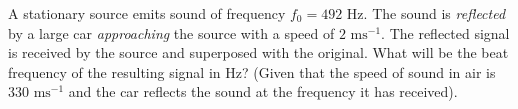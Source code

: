
    \item A stationary source emits sound of frequency \( f_0 = 492 \) Hz. The sound is \textit{reflected} by a large car \textit{approaching} the source with a speed of \( 2 \text{ ms}^{-1} \). The reflected signal is received by the source and superposed with the original. What will be the beat frequency of the resulting signal in Hz? (Given that the speed of sound in air is \( 330 \text{ ms}^{-1} \) and the car reflects the sound at the frequency it has received).
